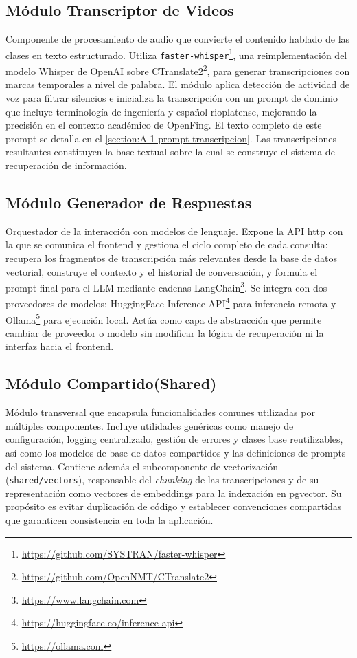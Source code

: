 \subsection{Módulo Transcriptor de Videos}
\label{subsection:4-Modulo Transcriptor de Videos}
Componente de procesamiento de audio que convierte el contenido hablado de las clases en texto estructurado. Utiliza \texttt{faster-whisper}\footnote{\url{https://github.com/SYSTRAN/faster-whisper}}, una reimplementación del modelo Whisper de OpenAI sobre CTranslate2\footnote{\url{https://github.com/OpenNMT/CTranslate2}}, para generar transcripciones con marcas temporales a nivel de palabra. El módulo aplica detección de actividad de voz para filtrar silencios e inicializa la transcripción con un prompt de dominio que incluye terminología de ingeniería y español rioplatense, mejorando la precisión en el contexto académico de OpenFing. El texto completo de este prompt se detalla en el \autoref{section:A-1-prompt-transcripcion}. Las transcripciones resultantes constituyen la base textual sobre la cual se construye el sistema de recuperación de información.

\subsection{Módulo Generador de Respuestas}
\label{subsection:4-Generator}
Orquestador de la interacción con modelos de lenguaje. Expone la API \acrshort{http} con la que se comunica el frontend y gestiona el ciclo completo de cada consulta: recupera los fragmentos de transcripción más relevantes desde la base de datos vectorial, construye el contexto y el historial de conversación, y formula el prompt final para el LLM mediante cadenas LangChain\footnote{\url{https://www.langchain.com}}. Se integra con dos proveedores de modelos: HuggingFace Inference API\footnote{\url{https://huggingface.co/inference-api}} para inferencia remota y Ollama\footnote{\url{https://ollama.com}} para ejecución local. Actúa como capa de abstracción que permite cambiar de proveedor o modelo sin modificar la lógica de recuperación ni la interfaz hacia el frontend.

\subsection{Módulo Compartido(Shared)}
\label{subsection:4-Shared}
Módulo transversal que encapsula funcionalidades comunes utilizadas por múltiples componentes. Incluye utilidades genéricas como manejo de configuración, logging centralizado, gestión de errores y clases base reutilizables, así como los modelos de base de datos compartidos y las definiciones de prompts del sistema. Contiene además el subcomponente de vectorización (\texttt{shared/vectors}), responsable del \textit{chunking} de las transcripciones y de su representación como vectores de embeddings para la indexación en pgvector. Su propósito es evitar duplicación de código y establecer convenciones compartidas que garanticen consistencia en toda la aplicación.


